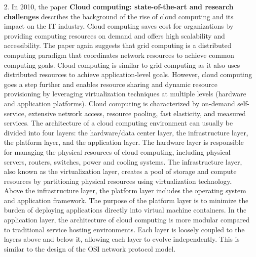 \documentclass[a4paper,twoside]{scrbook}
\begin{document}
\begin{CJK}{UTF8}{gbsn}
2. In 2010, the paper \textbf{Cloud computing: state-of-the-art and research challenges}\cite{zhang2010cloud} describes the background of the rise of cloud computing and its impact on the IT industry. Cloud computing saves cost for organizations by providing computing resources on demand and offers high scalability and accessibility.
The paper again suggests that grid computing is a distributed computing paradigm that coordinates network resources to achieve common computing goals. Cloud computing is similar to grid computing as it also uses distributed resources to achieve application-level goals. However, cloud computing goes a step further and enables resource sharing and dynamic resource provisioning by leveraging virtualization techniques at multiple levels (hardware and application platforms). Cloud computing is characterized by on-demand self-service, extensive network access, resource pooling, fast elasticity, and measured services.
The architecture of a cloud computing environment can usually be divided into four layers: the hardware/data center layer, the infrastructure layer, the platform layer, and the application layer. The hardware layer is responsible for managing the physical resources of cloud computing, including physical servers, routers, switches, power and cooling systems. The infrastructure layer, also known as the virtualization layer, creates a pool of storage and compute resources by partitioning physical resources using virtualization technology. Above the infrastructure layer, the platform layer includes the operating system and application framework. The purpose of the platform layer is to minimize the burden of deploying applications directly into virtual machine containers. In the application layer, the architecture of cloud computing is more modular compared to traditional service hosting environments. Each layer is loosely coupled to the layers above and below it, allowing each layer to evolve independently. This is similar to the design of the OSI network protocol model.



\end{CJK}
\end{document}

